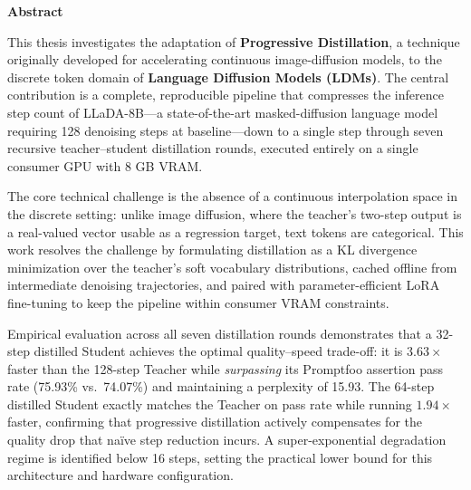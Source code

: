 \documentclass[11pt, a4paper]{article}
\begin{document}

\tableofcontents
\newpage

\newpage
\thispagestyle{fancy}
\begin{center}
    {\Large\bfseries Abstract}
\end{center}
\vspace{0.8cm}

\noindent This thesis investigates the adaptation of \textbf{Progressive Distillation}, a technique originally developed for accelerating continuous image-diffusion models, to the discrete token domain of \textbf{Language Diffusion Models (LDMs)}. The central contribution is a complete, reproducible pipeline that compresses the inference step count of LLaDA-8B---a state-of-the-art masked-diffusion language model requiring 128 denoising steps at baseline---down to a single step through seven recursive teacher--student distillation rounds, executed entirely on a single consumer GPU with 8 GB VRAM.

\vspace{0.5cm}
\noindent The core technical challenge is the absence of a continuous interpolation space in the discrete setting: unlike image diffusion, where the teacher's two-step output is a real-valued vector usable as a regression target, text tokens are categorical. This work resolves the challenge by formulating distillation as a KL divergence minimization over the teacher's soft vocabulary distributions, cached offline from intermediate denoising trajectories, and paired with parameter-efficient LoRA fine-tuning to keep the pipeline within consumer VRAM constraints.

\vspace{0.5cm}
\noindent Empirical evaluation across all seven distillation rounds demonstrates that a 32-step distilled Student achieves the optimal quality--speed trade-off: it is $3.63\times$ faster than the 128-step Teacher while \emph{surpassing} its Promptfoo assertion pass rate (75.93\% vs.\ 74.07\%) and maintaining a perplexity of 15.93. The 64-step distilled Student exactly matches the Teacher on pass rate while running $1.94\times$ faster, confirming that progressive distillation actively compensates for the quality drop that naïve step reduction incurs. A super-exponential degradation regime is identified below 16 steps, setting the practical lower bound for this architecture and hardware configuration.
\end{document}
